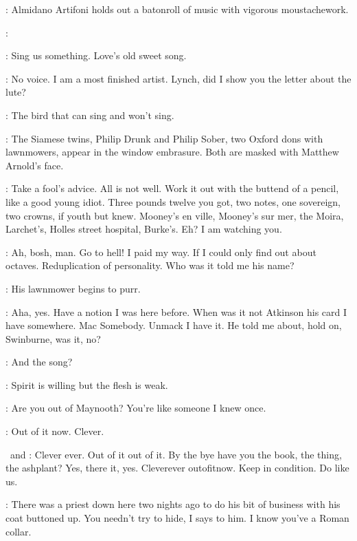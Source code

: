 :
Almidano Artifoni holds out a batonroll of music with vigorous moustachework.

\Artifoni:

\Florry[1]:
Sing us something.
Love's old sweet song.

\Stephen:
No voice.
I am a most finished artist.
Lynch,
did I show you the letter about the lute?

\Florry:
The bird that can sing and won't sing.

:
The Siamese twins,
Philip Drunk and Philip Sober,
two Oxford dons with lawnmowers,
appear in the window embrasure.
Both are masked with Matthew Arnold's face.

\PhilipSober[2]:
Take a fool's advice.
All is not well.
Work it out with the buttend of a pencil,
like a good young idiot.
Three pounds twelve you got,
two notes,
one sovereign,
two crowns,
if youth but knew.
Mooney's en ville,
Mooney's sur mer,
the Moira,
Larchet's,
Holles street hospital,
Burke's.
Eh? I am watching you.%

\PhilipDrunk[2]:
Ah,
bosh,
man.
Go to hell!
I paid my way.
If I could only find out about octaves.
Reduplication of personality.
Who was it told me his name?

:
His lawnmower begins to purr.

\PhilipDrunk:
Aha,
yes.
Have a notion I was here before.
When was it not Atkinson his card I have somewhere.
Mac Somebody.
Unmack I have it.
He told me about,
hold on,
Swinburne,
was it,
no?

\Florry:
And the song?

\Stephen:
Spirit is willing but the flesh is weak.

\Florry:
Are you out of Maynooth?
You're like someone I knew once.

\Stephen:
Out of it now.
Clever.


\PhilipDrunk\ and \PhilipSober:
Clever ever.
Out of it out of it.
By the bye have you the book,
the thing,
the ashplant?
Yes,
there it,
yes.
Cleverever outofitnow.
Keep in condition.
Do like us.

\Zoe:
There was a priest down here two nights ago
to do his bit of business with his coat buttoned up.
You needn't try to hide,
I says to him.
I know you've a Roman collar.

